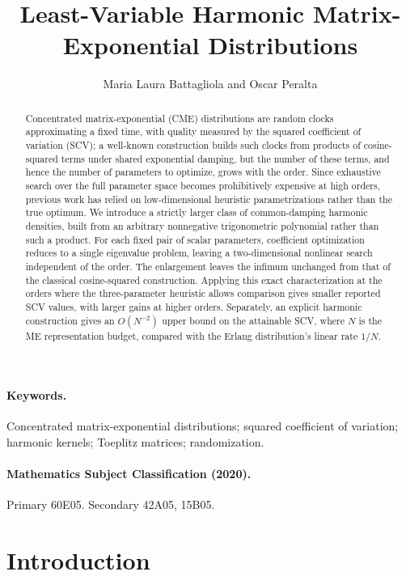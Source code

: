 \documentclass[11pt]{article}
\title{\textbf{Least-Variable Harmonic Matrix-Exponential Distributions}}
\author{Maria Laura Battagliola and Oscar Peralta}
\date{}
\numberwithin{equation}{section}
\theoremstyle{remark}
\begin{document}
\maketitle

\begin{abstract}
Concentrated matrix-exponential (CME) distributions are random clocks approximating a fixed time, with quality measured by the squared coefficient of variation (SCV); a well-known construction builds such clocks from products of cosine-squared terms under shared exponential damping, but the number of these terms, and hence the number of parameters to optimize, grows with the order. Since exhaustive search over the full parameter space becomes prohibitively expensive at high orders, previous work has relied on low-dimensional heuristic parametrizations rather than the true optimum. We introduce a strictly larger class of common-damping harmonic densities, built from an arbitrary nonnegative trigonometric polynomial rather than such a product. For each fixed pair of scalar parameters, coefficient optimization reduces to a single eigenvalue problem, leaving a two-dimensional nonlinear search independent of the order. The enlargement leaves the infimum unchanged from that of the classical cosine-squared construction. Applying this exact characterization at the orders where the three-parameter heuristic allows comparison gives smaller reported SCV values, with larger gains at higher orders. Separately, an explicit harmonic construction gives an $O(N^{-2})$ upper bound on the attainable SCV, where $N$ is the ME representation budget, compared with the Erlang distribution's linear rate $1/N$.
\end{abstract}

\paragraph{Keywords.}
Concentrated matrix-exponential distributions; squared coefficient of variation; harmonic kernels; Toeplitz matrices; randomization.

\paragraph{Mathematics Subject Classification (2020).}
Primary 60E05. Secondary 42A05, 15B05.

\section{Introduction}\label{sec:introduction}
\end{document}
